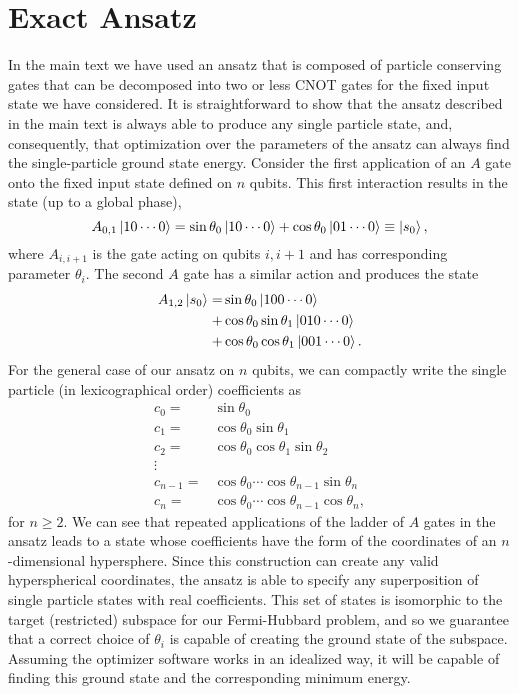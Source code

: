 \documentclass[
prx,
superscriptaddress,
twocolumn,
longbibliography
]{revtex4-1}
\begin{document}
\section{Exact Ansatz}
\label{app:exact}
In the main text we have used an ansatz that is composed of particle conserving gates that can be decomposed into two or less CNOT gates for the fixed input state we have considered. It is straightforward to show that the ansatz described in the main text is always able to produce any single particle state, and, consequently, that optimization over the parameters of the ansatz can always find the single-particle ground state energy. Consider the first application of an $A$ gate onto the fixed input state defined on $n$ qubits. This first interaction results in the state (up to a global phase),
\[
 A_{0,1}\ket{10\cdots0}=\sin{\theta_0}\ket{10\cdots0}+\cos{\theta_0}\ket{01\cdots0}\equiv \ket{s_0},
\]
where $A_{i,i+1}$ is the gate acting on qubits $i,i+1$ and has corresponding parameter $\theta_i$. The second $A$ gate has a similar action and produces the state
\begin{eqnarray}
 A_{1,2}\ket{s_0}=&\sin{\theta_0}\ket{100\cdots 0}\nonumber\\
 +&\cos{\theta_0}\sin{\theta_1}\ket{010\cdots 0}\nonumber\\
 +&\cos{\theta_0}\cos{\theta_1}\ket{001\cdots 0}\nonumber.
\end{eqnarray}
For the general case of our ansatz on $n$ qubits, we can compactly write the single particle  (in lexicographical order) coefficients as
\begin{eqnarray}
c_0=&\sin{\theta_0}\nonumber\\
c_1=&\cos{\theta_0}\sin{\theta_1}\nonumber\\
c_2=&\cos{\theta_0}\cos{\theta_1}\sin{\theta_2}\nonumber\\
\vdots\nonumber\\
c_{n-1}=&\cos{\theta_0}\cdots\cos{\theta_{n-1}}\sin{\theta_n}\nonumber\\
c_n=&\cos{\theta_0}\cdots\cos{\theta_{n-1}}\cos{\theta_n}\nonumber,
\end{eqnarray}
for $n\geq2$. We can see that repeated applications of the ladder of $A$ gates in the ansatz leads to a state whose coefficients have the form of the coordinates of an $n$-dimensional hypersphere. Since this construction can create any valid hyperspherical coordinates, the ansatz is able to specify any superposition of single particle states with real coefficients.  This set of states is isomorphic to the target (restricted) subspace for our Fermi-Hubbard problem, and so we guarantee that a correct choice of $\theta_i$ is capable of creating the ground state of the subspace. Assuming the optimizer software works in an idealized way, it will be capable of finding this ground state and the corresponding minimum energy.
\end{document}
